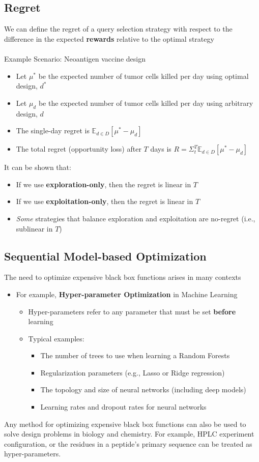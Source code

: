 \documentclass[10pt]{article}
\begin{document}
\subsection*{Regret}
We can define the regret of a query selection strategy with respect to the difference in the expected \textbf{rewards} relative to the optimal strategy\\\\
Example Scenario: Neoantigen vaccine design
\begin{itemize}
	\item Let $\mu^*$ be the expected number of tumor cells killed per day using optimal design, $d^*$
	\item Let $\mu_d$ be the expected number of tumor cells killed per day using arbitrary design, $d$
	\item The single-day regret is $\mathbb{E}_{d \in D}[\mu^* - \mu_d]$
	\item The total regret (opportunity loss) after $T$ days is $R = \Sigma_t^T \mathbb{E}_{d \in D} [\mu^* - \mu_d]$
\end{itemize}
It can be shown that:
\begin{itemize}
	\item If we use \textbf{exploration-only}, then the regret is linear in $T$
	\item If we use \textbf{exploitation-only}, then the regret is linear in $T$
	\item \textit{Some} strategies that balance exploration and exploitation are no-regret (i.e., sublinear in $T$)
\end{itemize}

\subsection*{Sequential Model-based Optimization}
The need to optimize expensive black box functions arises in many contexts
\begin{itemize}
	\item For example, \textbf{Hyper-parameter Optimization} in Machine Learning
	\begin{itemize}
	    \item Hyper-parameters refer to any parameter that must be set \textbf{before} learning
	    \item Typical examples:
	    \begin{itemize}
	        \item The number of trees to use when learning a Random Forests
            \item Regularization parameters (e.g., Lasso or Ridge regression)
            \item The topology and size of neural networks (including deep models)
            \item Learning rates and dropout rates for neural networks
        \end{itemize}
    \end{itemize}
\end{itemize}
Any method for optimizing expensive black box functions can also be used to solve design problems in biology and chemistry. For example, HPLC experiment configuration, or the residues in a peptide’s primary sequence can be treated as hyper-parameters.
\end{document}
